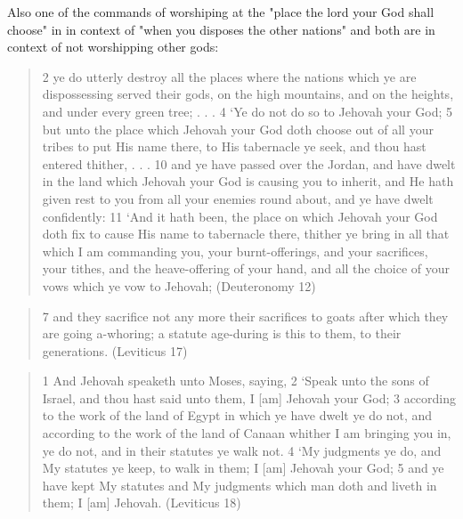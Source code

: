 \documentclass[11pt]{article}
\begin{document}
Also one of the commands of worshiping at the "place the lord your God shall choose" in in context of "when you disposes the other nations" and both are in context of not worshipping other gods:
\begin{quote}
2 ye do utterly destroy all the places where the nations which ye are dispossessing served their gods, on the high mountains, and on the heights, and under every green tree; . . . 4 `Ye do not do so to Jehovah your God;
5 but unto the place which Jehovah your God doth choose out of all your tribes to put His name there, to His tabernacle ye seek, and thou hast entered thither,
. . . 
10 and ye have passed over the Jordan, and have dwelt in the land which Jehovah your God is causing you to inherit, and He hath given rest to you from all your enemies round about, and ye have dwelt confidently:
11 `And it hath been, the place on which Jehovah your God doth fix to cause His name to tabernacle there, thither ye bring in all that which I am commanding you, your burnt-offerings, and your sacrifices, your tithes, and the heave-offering of your hand, and all the choice of your vows which ye vow to Jehovah; (Deuteronomy 12)
\end{quote}
\begin{quote}
7 and they sacrifice not any more their sacrifices to goats after which they are going a-whoring; a statute age-during is this to them, to their generations.
(Leviticus 17)
\end{quote}
\begin{quote}
1 And Jehovah speaketh unto Moses, saying,
2 `Speak unto the sons of Israel, and thou hast said unto them, I [am] Jehovah your God;
3 according to the work of the land of Egypt in which ye have dwelt ye do not, and according to the work of the land of Canaan whither I am bringing you in, ye do not, and in their statutes ye walk not.
4 `My judgments ye do, and My statutes ye keep, to walk in them; I [am] Jehovah your God;
5 and ye have kept My statutes and My judgments which man doth and liveth in them; I [am] Jehovah. (Leviticus 18)
\end{quote}
%
%
\end{document}
